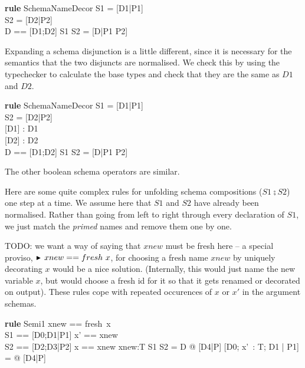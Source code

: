 \documentclass{article}
\newenvironment{zedrule}[1]{\par\textbf{rule }#1\vspace{-2ex}\infrule}{\endinfrule}
\newcommand{\derives}{\derive{}}
\newcommand{\substitute}{\mathrel{\curvearrowleft}}  %
\newcommand{\proviso}{\raisebox{0.5ex}{${}_{\blacktriangleright}\ $}}%
\begin{document}
\begin{zedrule}{SchemaNameDecor}
  S1 = [D1|P1] \\
  S2 = [D2|P2] \\
  \proviso D == [D1;D2]
\derives
  S1 \land S2 = [D|P1 \land P2]
\end{zedrule}


Expanding a schema disjunction is a little different,
since it is necessary for the semantics that the two
disjuncts are normalised.  We check this by using
the typechecker to calculate the base types and check
that they are the same as $D1$ and $D2$.

\begin{zedrule}{SchemaNameDecor}
  S1 = [D1|P1] \\
  S2 = [D2|P2] \\
  \proviso [D1] : \power D1 \\
  \proviso [D2] : \power D2 \\
  \proviso D == [D1;D2]
\derives
  S1 \lor S2 = [D|P1 \lor P2]
\end{zedrule}

The other boolean schema operators are similar.


Here are some quite complex rules for unfolding schema compositions
($S1 \semi S2$) one step at a time.  We assume here that $S1$
and $S2$ have already been normalised.  Rather than going from
left to right through every declaration of $S1$, we just match
the \emph{primed} names and remove them one by one.

TODO: we want a way of saying that $xnew$ must be fresh here
-- a special proviso, $\proviso xnew == fresh~x$, for choosing a
fresh name $xnew$ by uniquely decorating $x$ would be a nice solution.
(Internally, this would just name the new variable $x$, but would 
choose a fresh id for it so that it gets renamed or decorated on output).
These rules cope with repeated occurences of $x$ or $x'$
in the argument schemas.

\begin{zedrule}{Semi1}
  \proviso xnew == fresh~x \\
  \proviso S1 == [D0;D1|P1] \substitute \lblot x' == xnew \rblot \\
  \proviso S2 == [D2;D3|P2] \substitute \lblot x == xnew \rblot
  xnew:T \vdash S1 \semi S2 = \exists D @ [D4|P]
\derives
  [D0; x'~: T; D1 | P1] \semi [D2; x:T; D3 | P2]\\
      = \exists [xnew:T; D] @ [D4|P]
\end{zedrule}
\end{document}
